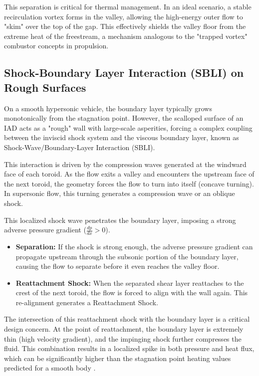 This separation is critical for thermal management. In an ideal scenario, a stable recirculation vortex forms in the valley, allowing the high-energy outer flow to "skim" over the top of the gap. This effectively shields the valley floor from the extreme heat of the freestream, a mechanism analogous to the "trapped vortex" combustor concepts in propulsion.


\subsection{Shock-Boundary Layer Interaction (SBLI) on Rough Surfaces}
On a smooth hypersonic vehicle, the boundary layer typically grows monotonically from the stagnation point. However, the scalloped surface of an IAD acts as a "rough" wall with large-scale asperities, forcing a complex coupling between the inviscid shock system and the viscous boundary layer, known as Shock-Wave/Boundary-Layer Interaction (SBLI).
\par
This interaction is driven by the compression waves generated at the windward face of each toroid. As the flow exits a valley and encounters the upstream face of the next toroid, the geometry forces the flow to turn into itself (concave turning). In supersonic flow, this turning generates a compression wave or an oblique shock.
\par
This localized shock wave penetrates the boundary layer, imposing a strong adverse pressure gradient ($\frac{dp}{dx} > 0$).
\begin{itemize}
    \item \textbf{Separation:} If the shock is strong enough, the adverse pressure gradient can propagate upstream through the subsonic portion of the boundary layer, causing the flow to separate before it even reaches the valley floor.
    \item \textbf{Reattachment Shock:} When the separated shear layer reattaches to the crest of the next toroid, the flow is forced to align with the wall again. This re-alignment generates a Reattachment Shock.
\end{itemize}

The intersection of this reattachment shock with the boundary layer is a critical design concern. At the point of reattachment, the boundary layer is extremely thin (high velocity gradient), and the impinging shock further compresses the fluid. This combination results in a localized spike in both pressure and heat flux, which can be significantly higher than the stagnation point heating values predicted for a smooth body \cite{AndersonHypersonic}.\cite{aerospace10080729SWBLISBLI}

